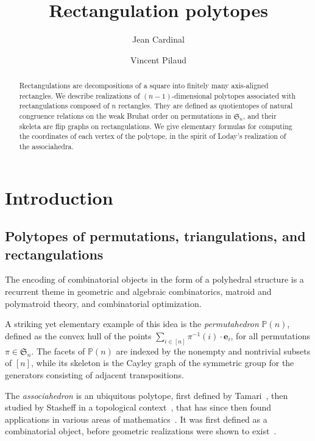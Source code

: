 \documentclass{amsart}
\title{Rectangulation polytopes}
\author{Jean Cardinal}
\author{Vincent Pilaud}
\theoremstyle{definition}
\newcommand{\f}[1]{\mathfrak{#1}} %
\newcommand{\darkblue}{\color{darkblue}} %
\newcommand{\defn}[1]{\textsl{\darkblue #1}} %
\newcommand{\polytope}[1]{\mathds{#1}} %
\begin{document}
\begin{abstract}
  Rectangulations are decompositions of a square into finitely many axis-aligned rectangles.
  We describe realizations of $(n-1)$-dimensional polytopes associated with rectangulations composed of $n$ rectangles. They are defined as quotientopes of natural congruence relations on the weak Bruhat order on permutations in $\f{S}_n$, and their skeleta are flip graphs on rectangulations. We give  elementary formulas for computing the coordinates of each vertex of the polytope, in the spirit of Loday's realization of the associahedra.
\end{abstract}

\maketitle

\tableofcontents

\newpage

\section{Introduction}

\subsection{Polytopes of permutations, triangulations, and rectangulations}

The encoding of combinatorial objects in the form of a polyhedral structure is a recurrent theme in geometric and algebraic combinatorics, matroid and polymatroid theory, and combinatorial optimization.

A striking yet elementary example of this idea is the \defn{permutahedron} $\polytope{P} (n)$, defined as the convex hull of the points $\sum_{i\in [n]} \pi^{-1}(i)\cdot \mathbf{e}_i$, for all permutations $\pi\in\f{S}_n$. The facets of $\polytope{P} (n)$ are indexed by the nonempty and nontrivial subsets of $[n]$, while its skeleton is the Cayley graph of the symmetric group for the generators consisting of adjacent transpositions.

The \defn{associahedron} is an ubiquitous polytope, first defined by Tamari~\cite{}, then studied by Stasheff in a topological context~\cite{}, that has since then found applications in various areas of mathematics~\cite{}. It was first defined as a combinatorial object, before geometric realizations were shown to exist~\cite{}.
\end{document}
